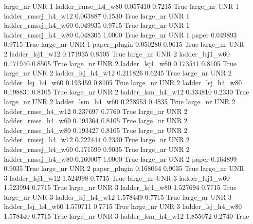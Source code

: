   large_nr      UNR                 1  ladder_rmse_h4_w80    0.057410      0.7215    True
  large_nr      UNR                 1 ladder_rmsej_h4_w12    0.063887      0.1530    True
  large_nr      UNR                 1 ladder_rmsej_h4_w60    0.049935      0.9715    True
  large_nr      UNR                 1 ladder_rmsej_h4_w80    0.048305      1.0000    True
  large_nr      UNR                 1               paper    0.049893      0.9715    True
  large_nr      UNR                 1        paper_plugin    0.050280      0.9615    True
  large_nr      UNR                 2     ladder_lsj1_w12    0.171935      0.8505    True
  large_nr      UNR                 2     ladder_lsj1_w60    0.171940      0.8505    True
  large_nr      UNR                 2     ladder_lsj1_w80    0.173541      0.8105    True
  large_nr      UNR                 2   ladder_lsj_h4_w12    0.211826      0.6245    True
  large_nr      UNR                 2   ladder_lsj_h4_w60    0.193459      0.8105    True
  large_nr      UNR                 2   ladder_lsj_h4_w80    0.198831      0.8105    True
  large_nr      UNR                 2   ladder_lsm_h4_w12    0.334810      0.2330    True
  large_nr      UNR                 2   ladder_lsm_h4_w60    0.228953      0.4835    True
  large_nr      UNR                 2  ladder_rmse_h4_w12    0.237697      0.7760    True
  large_nr      UNR                 2  ladder_rmse_h4_w60    0.193364      0.8105    True
  large_nr      UNR                 2  ladder_rmse_h4_w80    0.193427      0.8105    True
  large_nr      UNR                 2 ladder_rmsej_h4_w12    0.222444      0.2330    True
  large_nr      UNR                 2 ladder_rmsej_h4_w60    0.171599      0.9035    True
  large_nr      UNR                 2 ladder_rmsej_h4_w80    0.160007      1.0000    True
  large_nr      UNR                 2               paper    0.164899      0.9035    True
  large_nr      UNR                 2        paper_plugin    0.168064      0.9035    True
  large_nr      UNR                 3     ladder_lsj1_w12    1.524998      0.7715    True
  large_nr      UNR                 3     ladder_lsj1_w60    1.523994      0.7715    True
  large_nr      UNR                 3     ladder_lsj1_w80    1.527694      0.7715    True
  large_nr      UNR                 3   ladder_lsj_h4_w12    1.578449      0.7715    True
  large_nr      UNR                 3   ladder_lsj_h4_w60    1.570711      0.7715    True
  large_nr      UNR                 3   ladder_lsj_h4_w80    1.578440      0.7715    True
  large_nr      UNR                 3   ladder_lsm_h4_w12    1.855072      0.2740    True
